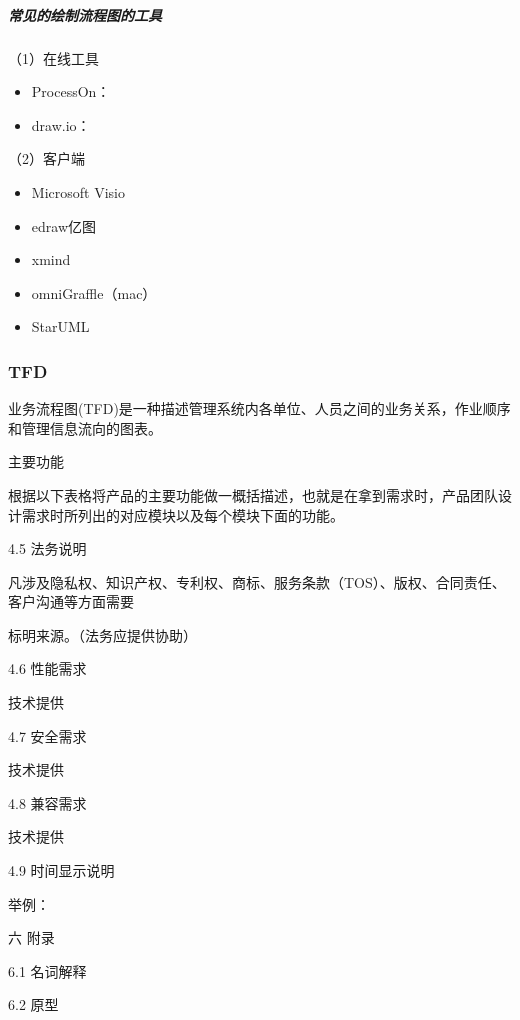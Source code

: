 \documentclass[letterpaper,11pt,english]{sphinxmanual}
\begin{document}
\subparagraph{常见的绘制流程图的工具}
\label{\detokenize{chapter_skill/flow_chart:id15}}
（1）在线工具
\begin{itemize}
\item {} 
ProcessOn：

\item {} 
draw.io：

\end{itemize}

（2）客户端
\begin{itemize}
\item {} 
Microsoft Visio

\item {} 
edraw亿图

\item {} 
xmind

\item {} 
omniGraffle（mac）

\item {} 
StarUML

\end{itemize}


\subsubsection{TFD}
\label{\detokenize{chapter_skill/TFD:tfd}}\label{\detokenize{chapter_skill/TFD::doc}}
业务流程图(TFD)是一种描述管理系统内各单位、人员之间的业务关系，作业顺序和管理信息流向的图表。

主要功能

根据以下表格将产品的主要功能做一概括描述，也就是在拿到需求时，产品团队设计需求时所列出的对应模块以及每个模块下面的功能。

4.5 法务说明

凡涉及隐私权、知识产权、专利权、商标、服务条款（TOS）、版权、合同责任、客户沟通等方面需要

标明来源。（法务应提供协助）

4.6 性能需求

技术提供

4.7 安全需求

技术提供

4.8 兼容需求

技术提供

4.9 时间显示说明

举例：

六 附录

6.1 名词解释

6.2 原型
\end{document}
